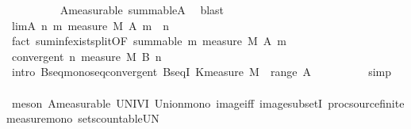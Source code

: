 \begin{isabellebody}
\ \ \ \ \ \ \ \ \isamarkupfalse%
\ A{\isacharunderscore}{\kern0pt}measurable\ summable{\isacharunderscore}{\kern0pt}A\ \isamarkupfalse%
\ blast{\isacharplus}{\kern0pt}\isanewline
\ \ \ \ \ \ \isamarkupfalse%
\ lim{\isacharunderscore}{\kern0pt}A{\isacharcolon}{\kern0pt}\ {\isachardoublequoteopen}{\isacharparenleft}{\kern0pt}{\isasymlambda}n{\isachardot}{\kern0pt}\ {\isacharparenleft}{\kern0pt}{\isasymSum}m{\isachardot}{\kern0pt}\ measure\ {\isacharquery}{\kern0pt}M\ {\isacharparenleft}{\kern0pt}A\ {\isacharparenleft}{\kern0pt}m\ {\isacharplus}{\kern0pt}\ n{\isacharparenright}{\kern0pt}{\isacharparenright}{\kern0pt}{\isacharparenright}{\kern0pt}{\isacharparenright}{\kern0pt}\ {\isasymlonglonglongrightarrow}\ {}{\isachardoublequoteclose}\isanewline
\ \ \ \ \ \ \ \ \isamarkupfalse%
\ {\isacharparenleft}{\kern0pt}fact\ suminf{\isacharunderscore}{\kern0pt}exist{\isacharunderscore}{\kern0pt}split{}{\isacharbrackleft}{\kern0pt}OF\ {\isacartoucheopen}summable\ {\isacharparenleft}{\kern0pt}{\isasymlambda}m{\isachardot}{\kern0pt}\ measure\ {\isacharquery}{\kern0pt}M\ {\isacharparenleft}{\kern0pt}A\ m{\isacharparenright}{\kern0pt}{\isacharparenright}{\kern0pt}{\isacartoucheclose}{\isacharbrackright}{\kern0pt}{\isacharparenright}{\kern0pt}\isanewline
\ \ \ \ \ \ \isamarkupfalse%
\ {\isachardoublequoteopen}convergent\ {\isacharparenleft}{\kern0pt}{\isasymlambda}n{\isachardot}{\kern0pt}\ measure\ {\isacharquery}{\kern0pt}M\ {\isacharparenleft}{\kern0pt}{\isacharquery}{\kern0pt}B\ n{\isacharparenright}{\kern0pt}{\isacharparenright}{\kern0pt}{\isachardoublequoteclose}\isanewline
\ \ \ \ \ \ \ \ \isamarkupfalse%
\ {\isacharparenleft}{\kern0pt}intro\ Bseq{\isacharunderscore}{\kern0pt}monoseq{\isacharunderscore}{\kern0pt}convergent\ BseqI{\isacharprime}{\kern0pt}{\isacharbrackleft}{\kern0pt}\ K{\isacharequal}{\kern0pt}{\isachardoublequoteopen}measure\ {\isacharquery}{\kern0pt}M\ {\isacharparenleft}{\kern0pt}{\isasymUnion}\ {\isacharparenleft}{\kern0pt}range\ A{\isacharparenright}{\kern0pt}{\isacharparenright}{\kern0pt}{\isachardoublequoteclose}{\isacharbrackright}{\kern0pt}{\isacharparenright}{\kern0pt}\isanewline
\ \ \ \ \ \ \ \ \isamarkupfalse%
\ simp\isanewline
\ \ \ \ \ \ \ \ \ \isamarkupfalse%
\ {\isacharparenleft}{\kern0pt}meson\ A{\isacharunderscore}{\kern0pt}measurable\ UNIV{\isacharunderscore}{\kern0pt}I\ Union{\isacharunderscore}{\kern0pt}mono\ image{\isacharunderscore}{\kern0pt}iff\ image{\isacharunderscore}{\kern0pt}subsetI\ proc{\isacharunderscore}{\kern0pt}source{\isachardot}{\kern0pt}finite{\isacharunderscore}{\kern0pt}measure{\isacharunderscore}{\kern0pt}mono\ sets{\isachardot}{\kern0pt}countable{\isacharunderscore}{\kern0pt}UN{\isacharparenright}{\kern0pt}\isanewline

\end{isabellebody}
